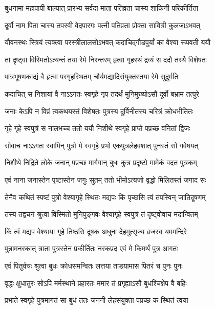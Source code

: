 \twolineshloka
{बुधनामा महापापी बाल्यात् प्रारभ्य सर्वदा}
{माता पतिव्रता चास्य शाकिनी परिकीर्तिता} %

\twolineshloka
{दूर्वो नाम पिता चास्य तपस्वी वेदपारगः}
{पत्नी पतिव्रता प्रोक्ता सावित्री कुलजाऽभवत्} %

\twolineshloka
{यौवनस्थः स्त्रियं त्यक्त्वा परस्त्रीलालसोऽभवत्}
{कदाचिद्गौडपुर्यां का वेश्या रूपवती ययौ} %

\twolineshloka
{तां दृष्ट्वा विस्मितोऽत्यन्तं तया रेमे निरन्तरम्}
{हृत्वा गृहस्थं द्रव्यं स ददौ तस्यै विशेषतः} %

\twolineshloka
{पात्रभूषणकाद्यं वै हृत्वा परगृहस्थितम्}
{चौर्यमद्यादिसंयुक्तस्तया रेमे सुदुर्मतिः} %

\twolineshloka
{कदाचित् स निशायां वै नाऽऽगतः स्वगृहे नृप}
{तदर्थं मुनिमुख्योऽसौ दूर्वो बभ्राम तत्पुरे} %

\twolineshloka
{जनाः केऽपि न विप्रं त्वकथयस्तं विशेषतः}
{पुत्रस्य दुर्विनीतस्य चरित्रं क्रोधभीतितः} %

\twolineshloka
{गृहे गृहे स्वपुत्रं स नालभच्च ततो ययौ}
{निशीथे स्वगृहे प्राप्ते पप्रच्छ वनितां द्विजः} %

\twolineshloka
{सोवाच नाऽऽगतः स्वामिन् पुत्रो मे स्वगृहे प्रभो}
{एकपुत्रलेहवशात् पुनस्तं सो गवेषयत्} %

\twolineshloka
{निशीथे निद्रिते लोके जनान् पप्रच्छ मार्गगान्}
{बुधः कुत्र प्रदृष्टो मामेकं वदत पुत्रकम्} %

\twolineshloka
{एवं नाना जनास्तेन पृष्टास्तेन जगुः सुतम्}
{ततो भीमोऽत्यजो वृद्धो मिलितस्तं जगाद सः} %

\twolineshloka
{तेनैव कथितं स्पष्टं पुत्रो वेश्यागृहे स्थितः}
{मद्यपः किं पृच्छसि त्वं तपस्विन् जातिदूषणम्} %

\twolineshloka
{तस्य तद्वचनं श्रुत्वा विस्मितो मुनिपुङ्गवः}
{वेश्यागृहे स्वपुत्रं तं दृष्ट्वोवाच मदान्वितम्} %

\twolineshloka
{किं त्वं मद्यप वेश्याया गृहे तिष्ठसि दूषक}
{अधुना देहमुत्सृज्य व्रजस्व यममन्दिरे} %

\twolineshloka
{पुन्नामनरकात् त्राता पुत्रस्तेन प्रकीर्तितः}
{नरकप्रद एवं मे किमर्थं पुत्र आगतः} %

\twolineshloka
{एवं पितुर्वचः श्रुत्वा बुधः क्रोधसमन्वितः}
{लत्तया ताडयामास पितरं च पुनः पुनः} %

\twolineshloka
{वृद्धः क्षुधातुरः सोऽपि मर्मस्थाने प्रहारतः}
{ममार तं प्रगृह्याऽसौ बुधश्चिक्षेप वै बहिः} %

\twolineshloka
{प्रभाते स्वगृहे पुत्रमागतं सा बुधं ततः}
{जननी लेहसंयुक्ता पप्रच्छ क स्थितं त्वया} %

